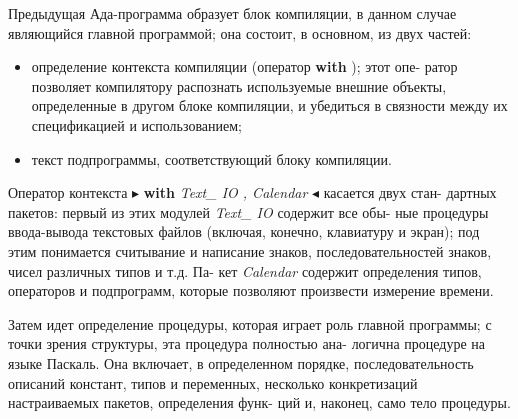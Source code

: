 \newpage

Предыдущая Ада-программа образует блок компиляции, в данном\linebreak
случае являющийся главной программой; она состоит, в основном, из\linebreak
двух частей:
\begin{itemize}
\item определение контекста компиляции (оператор {\bf with} ); этот опе­-\linebreak
ратор позволяет компилятору распознать используемые внешние\linebreak
объекты, определенные в другом блоке компиляции, и убедиться\linebreak
в связности между их спецификацией и использованием;
\item текст подпрограммы, соответствующий блоку компиляции.
\end{itemize}

\noindent Оператор контекста  $\blacktriangleright$ {\bf with} {\it Text\_ IO , Calendar} $\blacktriangleleft$ касается двух стан­-\linebreak
дартных пакетов: первый из этих модулей {\it Text\_ IO} содержит все обы-\linebreak
­ные процедуры ввода-вывода текстовых файлов (включая, конечно,\linebreak
клавиатуру и экран); под этим понимается считывание и написание\linebreak
знаков, последовательностей знаков, чисел различных типов и т.д. Па­-\linebreak
кет {\it Calendar} содержит определения типов, операторов и подпрограмм,\linebreak
которые позволяют произвести измерение времени.

Затем идет определение процедуры, которая играет роль главной\linebreak
программы; с точки зрения структуры, эта процедура полностью ана­-\linebreak
логична процедуре на языке Паскаль. Она включает, в определенном\linebreak
порядке, последовательность описаний констант, типов и переменных,\linebreak
несколько конкретизаций настраиваемых пакетов, определения функ­-\linebreak
ций и, наконец, само тело процедуры.

